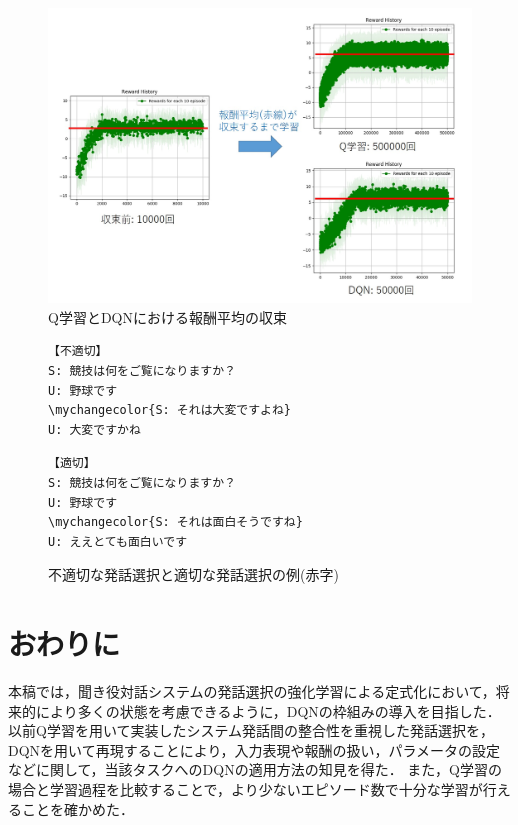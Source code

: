 \documentclass[a4j,dvipdfmx]{jarticle}
\newcommand\mychangecolor[1]{\textcolor[rgb]{1,0,0}{\textbf{#1}}}
\begin{document}
\begin{figure}[tb]
    \centering
    \includegraphics[width=0.8\hsize]{hosyusuii_re.jpg}
    \caption{Q学習とDQNにおける報酬平均の収束}
    \label{hosyu_suii_re}
\end{figure}


\begin{figure}[tb]
\centering


\begin{Verbatim}[commandchars=\\\{\}]
【不適切】
S: 競技は何をご覧になりますか？
U: 野球です
\mychangecolor{S: それは大変ですよね}
U: 大変ですかね
\end{Verbatim}

\begin{Verbatim}[commandchars=\\\{\}]
【適切】
S: 競技は何をご覧になりますか？
U: 野球です
\mychangecolor{S: それは面白そうですね}
U: ええとても面白いです
\end{Verbatim}


\caption{不適切な発話選択と適切な発話選択の例(赤字)}
\label{tekihuteki}
\end{figure}

\section{おわりに}
本稿では，聞き役対話システムの発話選択の強化学習による定式化において，将来的により多くの状態を考慮できるように，DQNの枠組みの導入を目指した．以前Q学習を用いて実装したシステム発話間の整合性を重視した発話選択を，DQNを用いて再現することにより，入力表現や報酬の扱い，パラメータの設定などに関して，当該タスクへのDQNの適用方法の知見を得た．
また，Q学習の場合と学習過程を比較することで，より少ないエピソード数で十分な学習が行えることを確かめた．

\end{document}
